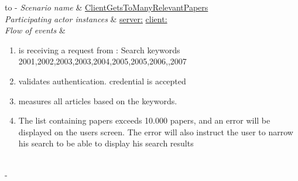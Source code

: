 %
%
\begin{table}[h!]
	\tabulinesep=1.5mm
	\begin{tabu} to 
		\tabucline[1.5pt]-
		\textit{Scenario name} & \underline{ClientGetsToManyRelevantPapers} \\
		\hline
		\textit{Participating actor \newline instances} & \underline{server:\serverside}
		\newline \underline{client:\clientside} \\
		\hline
		\textit{Flow of events} &
		\vspace{-3mm}
		\begin{enumerate}[leftmargin=*,topsep=0pt,itemsep=-1ex]
			\item \serverside is receiving a request from \clientside: Search keywords {2001,2002,2003,2003,2004,2005,2005,2006,,2007}
						
			\item \serverside validates \user authentication. \user credential is accepted
			
			\item \serverside measures all articles based on the keywords.
			
			\item The list containing papers exceeds 10.000 papers, and an error will be displayed on the users screen. The error will also instruct the user to narrow his search to be able to display his search results \\
			
		\end{enumerate} \\
		\tabucline[1.5pt]-
	\end{tabu}
	\caption{Scenario when a user has requested to many papers during one request.}
	\label{sc:ClientGetsToManyRelevantPapers}
\end{table}



